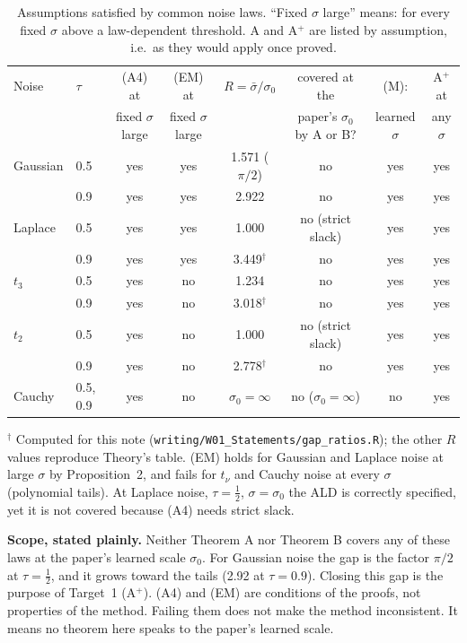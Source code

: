 \documentclass[11pt]{article}
\newcommand{\sbar}{\bar\sigma}
\theoremstyle{plain}
\theoremstyle{definition}
\theoremstyle{remark}
\begin{document}
\begin{table}[h]
\centering\small
\caption{Assumptions satisfied by common noise laws. ``Fixed $\sigma$ large'' means: for every fixed $\sigma$ above a law-dependent threshold. A and A$^+$ are listed by assumption, i.e.\ as they would apply once proved.}
\label{tab:noise}
\setlength{\tabcolsep}{4pt}
\begin{tabular}{@{}llcccccc@{}}
\toprule
Noise & $\tau$ & (A4) at & (EM) at & $R=\sbar/\sigma_0$ & covered at the & (M): & A$^+$ at \\
 & & fixed $\sigma$ large & fixed $\sigma$ large & & paper's $\sigma_0$ by A or B? & learned $\sigma$ & any $\sigma$ \\
\midrule
Gaussian & 0.5 & yes & yes & 1.571 ($\pi/2$) & no & yes & yes \\
         & 0.9 & yes & yes & 2.922 & no & yes & yes \\
Laplace  & 0.5 & yes & yes & 1.000 & no (strict slack) & yes & yes \\
         & 0.9 & yes & yes & 3.449$^\dagger$ & no & yes & yes \\
$t_3$    & 0.5 & yes & no  & 1.234 & no & yes & yes \\
         & 0.9 & yes & no  & 3.018$^\dagger$ & no & yes & yes \\
$t_2$    & 0.5 & yes & no  & 1.000 & no (strict slack) & yes & yes \\
         & 0.9 & yes & no  & 2.778$^\dagger$ & no & yes & yes \\
Cauchy   & 0.5, 0.9 & yes & no & $\sigma_0=\infty$ & no ($\sigma_0=\infty$) & no & yes \\
\bottomrule
\end{tabular}
\par\smallskip\raggedright\footnotesize
$^\dagger$ Computed for this note (\texttt{writing/W01\_Statements/gap\_ratios.R}); the other $R$ values reproduce Theory's table. (EM) holds for Gaussian and Laplace noise at large $\sigma$ by Proposition~2, and fails for $t_\nu$ and Cauchy noise at every $\sigma$ (polynomial tails). At Laplace noise, $\tau=\frac12$, $\sigma=\sigma_0$ the ALD is correctly specified, yet it is not covered because (A4) needs strict slack.
\end{table}

\noindent\textbf{Scope, stated plainly.} Neither Theorem A nor Theorem B covers any of these laws at the paper's learned scale $\sigma_0$. For Gaussian noise the gap is the factor $\pi/2$ at $\tau=\tfrac12$, and it grows toward the tails (2.92 at $\tau=0.9$). Closing this gap is the purpose of Target~1 (A$^+$).
(A4) and (EM) are conditions of the proofs, not properties of the method. Failing them does not make the method inconsistent. It means no theorem here speaks to the paper's learned scale.
\end{document}

